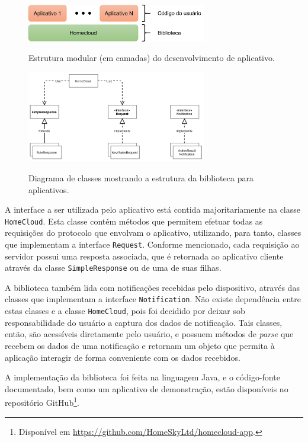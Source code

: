 \begin{figure}[h]
	\centering
	\caption{Estrutura modular (em camadas) do desenvolvimento de aplicativo.}
  \includegraphics[width=0.7\textwidth]{imagens/arquitetura_lib_app.png}
  \label{fig:arquitetura_lib_app}  
\end{figure}

\begin{figure}[h]
	\centering
	\caption{Diagrama de classes mostrando a estrutura da biblioteca para aplicativos.}
  \includegraphics[width=0.7\textwidth]{imagens/classes_lib_app.png}
  \label{fig:classes_lib_app}  
\end{figure}

A interface a ser utilizada pelo aplicativo está contida majoritariamente na classe \texttt{HomeCloud}. Esta classe contém métodos que permitem efetuar todas as requisições do protocolo que envolvam o aplicativo, utilizando, para tanto, classes que implementam a interface \texttt{Request}. Conforme mencionado, cada requisição ao servidor possui uma resposta associada, que é retornada ao aplicativo cliente através da classe \texttt{SimpleResponse} ou de uma de suas filhas.

A biblioteca também lida com notificações recebidas pelo dispositivo, através das classes que implementam a interface \texttt{Notification}. Não existe dependência entre estas classes e a classe \texttt{HomeCloud}, pois foi decidido por deixar sob responsabilidade do usuário a captura dos dados de notificação. Tais classes, então, são acessíveis diretamente pelo usuário, e possuem métodos de \textit{parse} que recebem os dados de uma notificação e retornam um objeto que permita à aplicação interagir de forma conveniente com os dados recebidos.

A implementação da biblioteca foi feita na linguagem Java, e o código-fonte documentado, bem como um aplicativo de demonstração, estão disponíveis no repositório GitHub\footnote{Disponível em \url{https://github.com/HomeSkyLtd/homecloud-app}.}.

